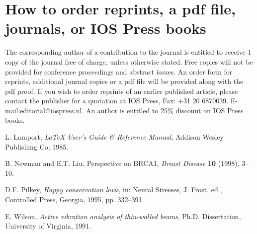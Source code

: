 \documentclass{iosart2c}
\begin{document}
\section{How to order reprints, a pdf file, journals, or IOS Press
books}
The corresponding author of a contribution to the journal is entitled to receive 1 copy of the journal free of charge, unless otherwise stated. Free copies will not be provided for conference proceedings and abstract issues. An order form for reprints,
additional journal copies or a pdf file will be provided along with the pdf proof.
If you wish to order reprints of an earlier published article, please contact the publisher for a quotation at IOS Press, Fax:
+31 20 6870039. E-mail:\break editorial@iospress.nl.
An author is entitled to 25\% discount on IOS Press books.\vadjust{\vfill\eject}

\begin{thebibliography}{0}

 L. Lamport, \textit{\LaTeX{} User's Guide \& Reference Manual},
 Addison Wesley Publishing Co, 1985.

 B. Newman and E.T. Liu, Perspective on BRCA1, \textit{Breast Disease} \textbf{10} (1998), 3--10.

 D.F. Pilkey, \textit{Happy conservation laws}, in: Neural Stresses, J. Frost, ed., Controlled Press, Georgia, 1995, pp. 332--391.

 E. Wilson, \textit{Active vibration analysis of thin-walled beams}, Ph.D. Dissertation, University of Virginia, 1991.

\end{thebibliography}
\end{document}
